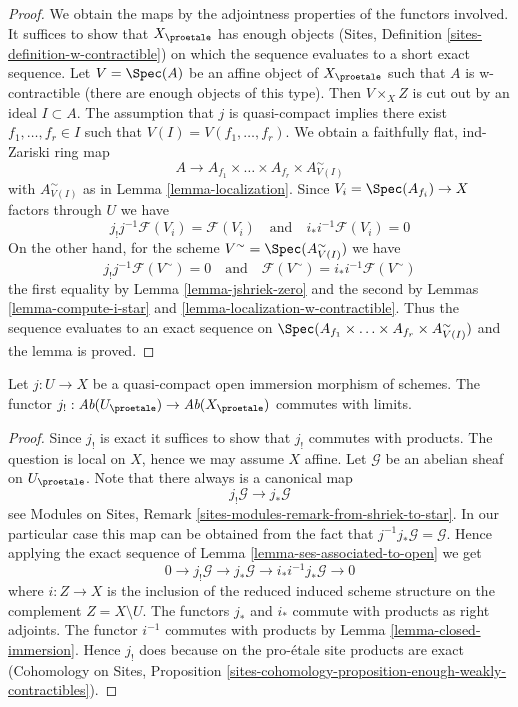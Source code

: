 \begin{proof}
We obtain the maps by the adjointness properties of the functors involved.
It suffices to show that $X_\proetale$ has enough objects
(Sites, Definition \ref{sites-definition-w-contractible}) on which
the sequence evaluates to a short exact sequence.
Let $V = \Spec(A)$ be an affine object of $X_\proetale$
such that $A$ is w-contractible (there are enough objects of this type).
Then $V \times_X Z$ is cut out by an ideal $I \subset A$.
The assumption that $j$ is quasi-compact implies there exist
$f_1, \ldots, f_r \in I$ such that $V(I) = V(f_1, \ldots, f_r)$.
We obtain a faithfully flat, ind-Zariski ring map
$$
A \longrightarrow A_{f_1} \times \ldots \times A_{f_r} \times
A_{V(I)}^\sim
$$
with $A_{V(I)}^\sim$ as in Lemma \ref{lemma-localization}.
Since $V_i = \Spec(A_{f_i}) \to X$ factors through $U$ we have
$$
j_!j^{-1}\mathcal{F}(V_i) = \mathcal{F}(V_i)
\quad\text{and}\quad
i_*i^{-1}\mathcal{F}(V_i) = 0
$$
On the other hand, for the scheme $V^\sim = \Spec(A_{V(I)}^\sim)$
we have
$$
j_!j^{-1}\mathcal{F}(V^\sim) = 0
\quad\text{and}\quad
\mathcal{F}(V^\sim) = i_*i^{-1}\mathcal{F}(V^\sim)
$$
the first equality by Lemma \ref{lemma-jshriek-zero}
and the second by
Lemmas \ref{lemma-compute-i-star} and \ref{lemma-localization-w-contractible}.
Thus the sequence evaluates to an exact sequence on
$\Spec(A_{f_1} \times \ldots \times A_{f_r} \times A_{V(I)}^\sim)$
and the lemma is proved.
\end{proof}

\begin{lemma}
\label{lemma-j-shriek-limits}
Let $j : U \to X$ be a quasi-compact open immersion
morphism of schemes. The functor
$j_! : \textit{Ab}(U_\proetale) \to \textit{Ab}(X_\proetale)$
commutes with limits.
\end{lemma}

\begin{proof}
Since $j_!$ is exact it suffices to show that $j_!$ commutes with products.
The question is local on $X$, hence we may assume $X$ affine.
Let $\mathcal{G}$ be an abelian sheaf on $U_\proetale$.
Note that there always is a canonical map
$$
j_!\mathcal{G} \to j_*\mathcal{G}
$$
see Modules on Sites, Remark \ref{sites-modules-remark-from-shriek-to-star}.
In our particular case this map can be obtained from the
fact that $j^{-1}j_*\mathcal{G} = \mathcal{G}$. Hence applying
the exact sequence of Lemma \ref{lemma-ses-associated-to-open}
we get
$$
0 \to j_!\mathcal{G} \to j_*\mathcal{G} \to i_*i^{-1}j_*\mathcal{G} \to 0
$$
where $i : Z \to X$ is the inclusion of the reduced induced scheme
structure on the complement $Z = X \setminus U$.
The functors $j_*$ and $i_*$ commute with products as right adjoints.
The functor $i^{-1}$ commutes with products by
Lemma \ref{lemma-closed-immersion}.
Hence $j_!$ does because on the pro-\'etale site products
are exact
(Cohomology on Sites, Proposition
\ref{sites-cohomology-proposition-enough-weakly-contractibles}).
\end{proof}





